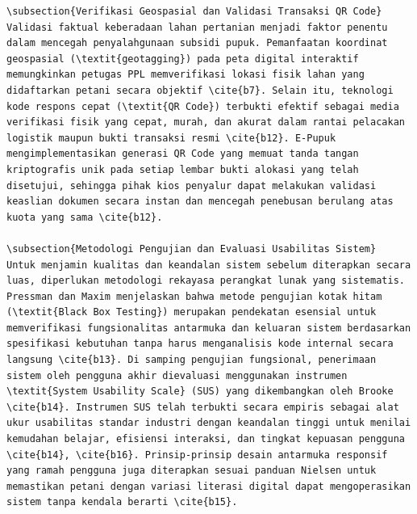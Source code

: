 \documentclass[conference]{IEEEtran}
\begin{document}
\begin{lstlisting}
\subsection{Verifikasi Geospasial dan Validasi Transaksi QR Code}
Validasi faktual keberadaan lahan pertanian menjadi faktor penentu dalam mencegah penyalahgunaan subsidi pupuk. Pemanfaatan koordinat geospasial (\textit{geotagging}) pada peta digital interaktif memungkinkan petugas PPL memverifikasi lokasi fisik lahan yang didaftarkan petani secara objektif \cite{b7}. Selain itu, teknologi kode respons cepat (\textit{QR Code}) terbukti efektif sebagai media verifikasi fisik yang cepat, murah, dan akurat dalam rantai pelacakan logistik maupun bukti transaksi resmi \cite{b12}. E-Pupuk mengimplementasikan generasi QR Code yang memuat tanda tangan kriptografis unik pada setiap lembar bukti alokasi yang telah disetujui, sehingga pihak kios penyalur dapat melakukan validasi keaslian dokumen secara instan dan mencegah penebusan berulang atas kuota yang sama \cite{b12}.

\subsection{Metodologi Pengujian dan Evaluasi Usabilitas Sistem}
Untuk menjamin kualitas dan keandalan sistem sebelum diterapkan secara luas, diperlukan metodologi rekayasa perangkat lunak yang sistematis. Pressman dan Maxim menjelaskan bahwa metode pengujian kotak hitam (\textit{Black Box Testing}) merupakan pendekatan esensial untuk memverifikasi fungsionalitas antarmuka dan keluaran sistem berdasarkan spesifikasi kebutuhan tanpa harus menganalisis kode internal secara langsung \cite{b13}. Di samping pengujian fungsional, penerimaan sistem oleh pengguna akhir dievaluasi menggunakan instrumen \textit{System Usability Scale} (SUS) yang dikembangkan oleh Brooke \cite{b14}. Instrumen SUS telah terbukti secara empiris sebagai alat ukur usabilitas standar industri dengan keandalan tinggi untuk menilai kemudahan belajar, efisiensi interaksi, dan tingkat kepuasan pengguna \cite{b14}, \cite{b16}. Prinsip-prinsip desain antarmuka responsif yang ramah pengguna juga diterapkan sesuai panduan Nielsen untuk memastikan petani dengan variasi literasi digital dapat mengoperasikan sistem tanpa kendala berarti \cite{b15}.


\end{lstlisting}
\end{document}
